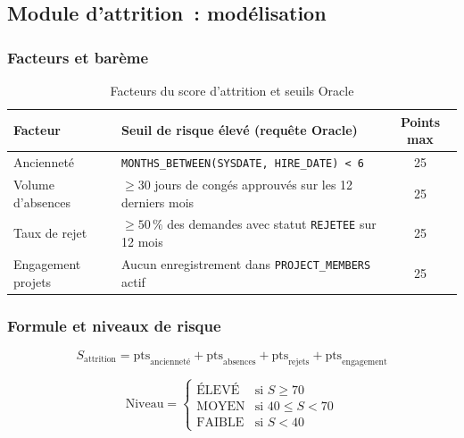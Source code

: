 \subsection{Module d'attrition~: modélisation}

\subsubsection*{Facteurs et barème}

\begin{table}[H]
\centering
\caption{Facteurs du score d'attrition et seuils Oracle}
\label{tab:attrition}
\begin{tabularx}{\textwidth}{|l|L|C|}
\hline
{}\textbf{Facteur} & \textbf{Seuil de risque élevé (requête Oracle)} & \textbf{Points max} \\\hline
{}
Ancienneté & \texttt{MONTHS\_BETWEEN(SYSDATE, HIRE\_DATE) < 6} & 25 \\\hline
Volume d'absences & $\geq 30$ jours de congés approuvés sur les 12 derniers mois & 25 \\\hline
{}
Taux de rejet & $\geq 50\,\%$ des demandes avec statut \texttt{REJETEE} sur 12 mois & 25 \\\hline
Engagement projets & Aucun enregistrement dans \texttt{PROJECT\_MEMBERS} actif & 25 \\\hline
\end{tabularx}
\end{table}

\subsubsection*{Formule et niveaux de risque}

\begin{equation}
  S_{\text{attrition}} =
  \text{pts}_{\text{ancienneté}} + \text{pts}_{\text{absences}}
  + \text{pts}_{\text{rejets}} + \text{pts}_{\text{engagement}}
  \label{eq:attrition}
\end{equation}

\begin{equation}
  \text{Niveau} =
  \begin{cases}
    \text{ÉLEVÉ}  & \text{si } S \geq 70 \\
    \text{MOYEN}  & \text{si } 40 \leq S < 70 \\
    \text{FAIBLE} & \text{si } S < 40
  \end{cases}
\end{equation}


